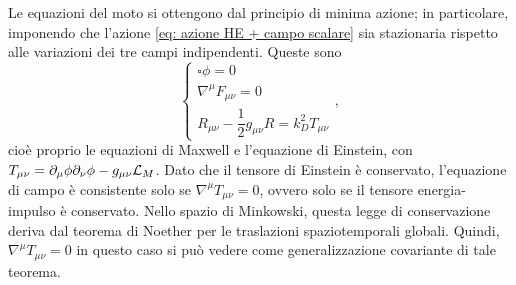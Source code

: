 Le equazioni del moto si ottengono dal principio di minima azione; in particolare, imponendo che l'azione \eqref{eq: azione HE + campo scalare} sia stazionaria rispetto alle variazioni dei tre campi indipendenti. Queste sono 
\begin{equation}
    \begin{cases}
        \square\phi = 0 \\
        \nabla^\mu F_{\mu\nu} = 0 \\
        R_{\mu\nu} - \dfrac{1}{2}g_{\mu\nu}R = k_D^2T_{\mu\nu}
    \end{cases},
\end{equation}
cioè proprio le equazioni di Maxwell e l'equazione di Einstein, con $T_{\mu\nu} = \partial_\mu\phi\partial_\nu\phi - g_{\mu\nu}\mathcal{L}_M$. Dato che il tensore di Einstein è conservato, l'equazione di campo è consistente solo se $\nabla^\mu T_{\mu\nu} = 0$, ovvero solo se il tensore energia-impulso è conservato. Nello spazio di Minkowski, questa legge di conservazione deriva dal teorema di Noether per le traslazioni spaziotemporali globali. Quindi, $\nabla^\mu T_{\mu\nu} = 0$ in questo caso si può vedere come generalizzazione covariante di tale teorema. 

